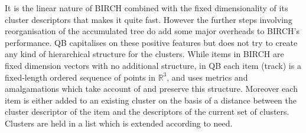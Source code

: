 \documentclass[preprint,authoryear,a4paper,10pt,onecolumn]{elsarticle}
\begin{document}
\begin{appendices}
It is the linear nature of BIRCH combined with the fixed dimensionality
of its cluster descriptors that makes it quite fast. However the further
steps involving reorganisation of the accumulated tree do add some major
overheads to BIRCH's performance. QB capitalises on these positive
features but does not try to create any kind of hierarchical structure
for the clusters. While items in BIRCH are fixed dimension vectors with
no additional structure, in QB each item (track) is a fixed-length
ordered sequence of points in $\mathbb{R}^{3}$, and uses metrics and
amalgamations which take account of and preserve this structure.
Moreover each item is either added to an existing cluster on the basis
of a distance between the cluster descriptor of the item and the
descriptors of the current set of clusters. Clusters are held in a list
which is extended according to need.

\end{appendices}
\end{document}
